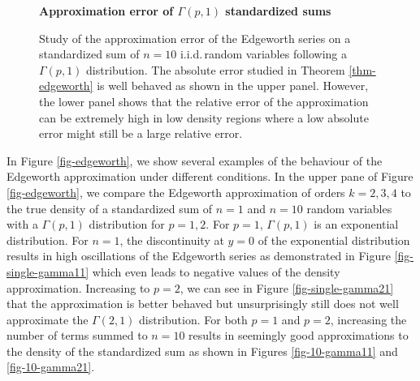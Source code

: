 \begin{example}
    
    \begin{figure}[!htbp]
        \textbf{Approximation error of $\Gamma(p,1)$ standardized sums}
        \centering
        \qquad
        \caption{Study of the approximation error of the Edgeworth series on a standardized sum of $n=10$ i.i.d.\,random variables following a $\Gamma(p, 1)$ distribution. The absolute error studied in Theorem \ref{thm-edgeworth} is well behaved as shown in the upper panel. However, the lower panel shows that the relative error of the approximation can be extremely high in low density regions where a low absolute error might still be a large relative error.}
        \label{fig-edgeworth-err}
    \end{figure}
    


    In Figure \ref{fig-edgeworth}, we show several examples of the behaviour of the Edgeworth approximation under different conditions. In the upper pane of Figure \ref{fig-edgeworth}, we compare the Edgeworth approximation of orders $k=2, 3, 4$ to the true density of a standardized sum of $n=1$ and $n=10$ random variables with a $\Gamma(p, 1)$ distribution for $p=1,2$. For $p=1$, $\Gamma(p, 1)$ is an exponential distribution. For $n = 1$, the discontinuity at $y = 0$ of the exponential distribution results in high oscillations of the Edgeworth series as demonstrated in Figure \ref{fig-single-gamma11} which even leads to negative values of the density approximation. Increasing to $p = 2$, we can see in Figure \ref{fig-single-gamma21} that the approximation is better behaved but unsurprisingly still does not well approximate the $\Gamma(2, 1)$ distribution. For both $p=1$ and $p=2$, increasing the number of terms summed to $n = 10$ results in seemingly good approximations to the density of the standardized sum as shown in Figures \ref{fig-10-gamma11} and \ref{fig-10-gamma21}.


\end{example}
